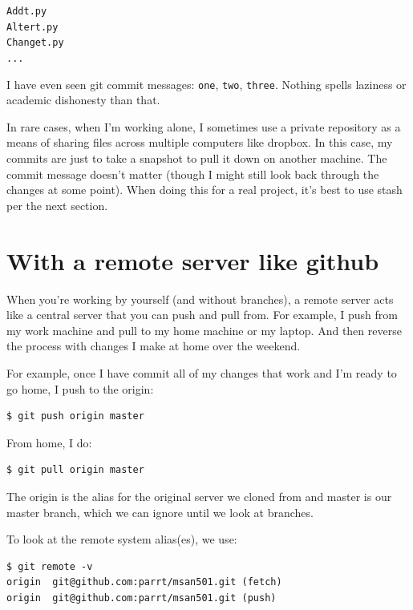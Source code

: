 \begin{alltt}
Add t.py
Alter t.py
Change t.py
...
\end{alltt}

I have even seen git commit messages: {\tt one}, {\tt two}, {\tt three}. Nothing spells laziness or academic dishonesty than that.

In rare cases, when I'm working alone, I sometimes use a private repository as a means of sharing files across multiple computers like dropbox. In this case, my commits are just to take a snapshot to pull it down on another machine. The commit message doesn't matter (though I might still look back through the changes at some point). When doing this for a real project, it's best to use stash per the next section.

\section{With a remote server like github}

When you're working by yourself (and without branches), a remote server acts like a central server that you can push and pull from. For example, I push from my work machine and pull to my home machine or my laptop. And then reverse the process with changes I make at home over the weekend.

For example, once I have commit all of my changes that work and I'm ready to go home, I push to the origin:

\begin{lstlisting}[style=BashInputStyle]
$ git push origin master
\end{lstlisting}

\noindent From home, I do:

\begin{lstlisting}[style=BashInputStyle]
$ git pull origin master
\end{lstlisting}

\noindent The origin is the alias for the original server we cloned from and master is our master branch, which we can ignore until we look at branches.

To look at the remote system alias(es), we use:

\begin{lstlisting}[style=BashInputStyle]
$ git remote -v
origin  git@github.com:parrt/msan501.git (fetch)
origin  git@github.com:parrt/msan501.git (push)
\end{lstlisting}

